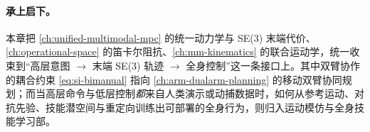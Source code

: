 \paragraph{承上启下。}
本章把 \cref{ch:unified-multimodal-mpc} 的统一动力学与 SE(3) 末端代价、\cref{ch:operational-space} 的笛卡尔阻抗、\cref{ch:mm-kinematics} 的联合运动学，统一收束到“高层意图 $\to$ 末端 SE(3) 轨迹 $\to$ 全身控制”这一条接口上。其中双臂协作的耦合约束 \cref{eq:si-bimanual} 指向 \cref{ch:arm-dualarm-planning} 的移动双臂协同规划；而当高层命令与低层控制\emph{都}来自人类演示或动捕数据时，如何从参考运动、对抗先验、技能潜空间与重定向训练出可部署的全身行为，则归入运动模仿与全身技能学习部。

